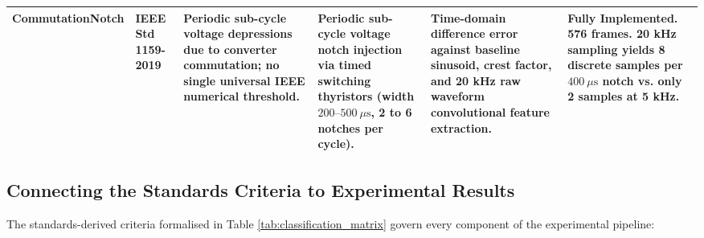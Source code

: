 \documentclass[12pt,a4paper]{report}
\begin{document}
\begin{table}[H]
\begin{tabularx}{\textwidth}{p{1.7cm}p{1.6cm}p{2.5cm}p{2.7cm}p{2.7cm}p{2.4cm}}
\addlinespace
\textbf{Commutation\newline Notch} & IEEE Std 1159-2019 & Periodic sub-cycle voltage depressions due to converter commutation; no single universal IEEE numerical threshold. & Periodic sub-cycle voltage notch injection via timed switching thyristors (width $200\text{--}500\ \mu\text{s}$, 2 to 6 notches per cycle). & Time-domain difference error against baseline sinusoid, crest factor, and 20 kHz raw waveform convolutional feature extraction. & \textbf{Fully Implemented.} 576 frames. 20 kHz sampling yields 8 discrete samples per $400\ \mu\text{s}$ notch vs. only 2 samples at 5 kHz. \\
\bottomrule
\end{tabularx}
\end{table}

\subsection{Connecting the Standards Criteria to Experimental Results}
The standards-derived criteria formalised in Table \ref{tab:classification_matrix} govern every component of the experimental pipeline:
\end{document}
